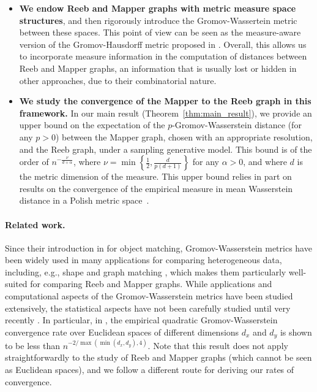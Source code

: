 \begin{itemize}
    \item {\bf We endow Reeb and Mapper graphs with metric measure space structures}, and then rigorously introduce the Gromov-Wassertein metric between these spaces. This point of view can be seen as the measure-aware version of the Gromov-Hausdorff metric proposed in \cite{carriere2022statistical}. Overall, this allows us to incorporate measure information in the computation of distances between Reeb and Mapper graphs, an information that is usually lost or hidden in other approaches, due to their combinatorial nature. %
    
    \item {\bf We study the convergence of the Mapper to the Reeb graph in this framework.} In our main result (Theorem~\ref{thm:main_result}), we provide an upper bound on the expectation of the $p$-Gromov-Wasserstein  distance (for any $p >0$) between the Mapper graph, chosen with an appropriate resolution, and the Reeb graph, under a sampling generative model. This bound is of the order of  $n^{-\frac{\nu}{d+\alpha}} $,
    where $\nu=\min\left\{\frac{1}{2},\frac{d}{p(d+1)}\right\}$ for any $\alpha >0$, and where $d$ is the metric dimension of the measure. This upper bound relies in part on results on the convergence of the empirical measure in mean Wasserstein distance in a Polish metric space~\cite{weed2019sharp}. %
\end{itemize}

\paragraph{Related work.} Since their introduction in \cite{memoli2011gromov} for object matching, Gromov-Wasserstein metrics have been widely used in many applications for comparing 
heterogeneous data, including, e.g., shape and graph matching \cite{memoli2009spectral,xu2019gromov,xu2019scalable,koehl2023computing}, which makes them particularly well-suited for comparing %
Reeb and Mapper graphs. %
While applications and computational aspects of the Gromov-Wasserstein metrics have been studied extensively, the statistical aspects have not been carefully studied until very recently \cite{han2023covariance,zhang2024gromov, rioux2024limit}. In particular, in \cite{zhang2024gromov},  the empirical quadratic Gromov-Wasserstein convergence rate over Euclidean spaces of different dimensions $d_x$ and $d_y$ is shown to be less than $n^{-2/ \max(\min(d_x,d_y),4)}$. Note that this result does not apply straightforwardly to the study of Reeb and Mapper graphs (which cannot be seen as Euclidean spaces), %
and we follow a different route for deriving our rates of convergence. %


